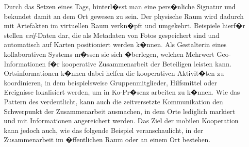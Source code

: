 
Durch das Setzen eines Tags, hinterl�sst man eine pers�nliche Signatur und bekundet damit an dem Ort gewesen zu sein. Der physische Raum wird dadurch mit Artefakten im virtuellen Raum verkn�pft und umgekehrt. Beispiele hierf�r stellen \textit{exif}-Daten dar, die als Metadaten von Fotos gespeichert sind und automatisch auf Karten positioniert werden k�nnen. 
Als Gestalterin eines kollaborativen Systems m�ssen sie sich �berlegen, welchen Mehrwert Geo-Informationen f�r kooperative Zusammenarbeit der Beteiligen leisten kann. Ortsinformationen k�nnen dabei helfen die kooperativen Aktivit�ten zu koordinieren, in dem beispielsweise Gruppenmitglieder, Hilfsmittel oder Ereignisse lokalisiert werden, um in Ko-Pr�senz arbeiten zu k�nnen. Wie das Pattern des  verdeutlicht, kann auch die zeitversetzte Kommunikation den Schwerpunkt der Zusammenarbeit ausmachen, in dem Orte lediglich markiert und mit Informationen angereichert werden. Das Ziel der mobilen Kooperation kann jedoch auch, wie das folgende Beispiel veranschaulicht, in der Zusammenarbeit im �ffentlichen Raum oder an einem Ort bestehen.



